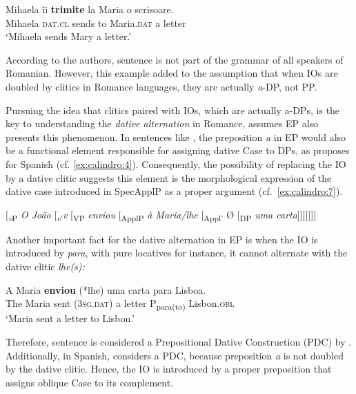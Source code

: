 \documentclass[output=paper,colorlinks,citecolor=brown,modfonts,nonflat]{langsci/langscibook}
\begin{document}
\ea%
    \label{ex:calindro:6}
    \gll Mihaela {îi}    \textbf{trimite}   {la} {Maria}    o scrisoare.\\
    Mihaela \textsc{dat.cl}  sends     to Maria.\textsc{dat}  a letter\\
    \glt `Mihaela sends Mary a letter.'\hfill \citep[14]{DiaconescuRivero2007}
    \z

According to the authors, sentence  is not part of the grammar of all speakers of Romanian. However, this example added to the assumption that when IOs are doubled by clitics in Romance languages, they are actually \textit{a}-DP, not PP.

Pursuing the idea that clitics paired with IOs, which are actually a-DPs, is the key to understanding the \textit{dative alternation} in Romance, \citet{TorresMorais2007} assumes EP also presents this phenomenon. In sentences like , the preposition \textit{a} in EP would also be a functional element responsible for assigning dative Case to DPs, as \citet{Cuervo2003} proposes for Spanish (cf. \ref{ex:calindro:4}). Consequently, the possibility of replacing the IO by a dative clitic suggests this element is the morphological expression of the dative case introduced in SpecApplP as a proper argument (cf.~\ref{ex:calindro:7}).

\ea%
    \label{ex:calindro:7}{}
    [\textit{\textsubscript{v}}\textsubscript{P} \textit{O João} [\textit{\textsubscript{v}}\textsubscript{’}\textit{v} [\textsubscript{VP} \textit{enviou} [\textsubscript{ApplP} \textit{à Maria/lhe} [\textsubscript{Appl’} Ø [\textsubscript{DP} \textit{uma carta}]]]]]]] \hfill \citep[175]{TorresMorais2007}
    \z

Another important fact for the dative alternation in EP is when the IO is introduced by \textit{para}, with pure locatives for instance, it cannot alternate with the dative clitic \textit{lhe(s):}

\ea%
    \label{ex:calindro:8}
    \gll A Maria     \textbf{enviou} (*lhe)      uma carta  {para} {Lisboa}.\\
    The Maria sent (\textsc{3sg.dat})  a letter      P{\textsubscript{para(to)}} Lisbon.\textsc{obl}\\
    \glt `Maria sent a letter to Lisbon.'\hfill \citep[96]{TorresMorais2007}
    \z

Therefore, sentence  is considered a Prepositional Dative Construction (PDC) by \citet{TorresMorais2007}. Additionally, in Spanish, \citet{Cuervo2003} considers  a PDC, because preposition \textit{a} is not doubled by the dative clitic. Hence, the IO is introduced by a proper preposition that assigns oblique Case to its complement.
\end{document}
